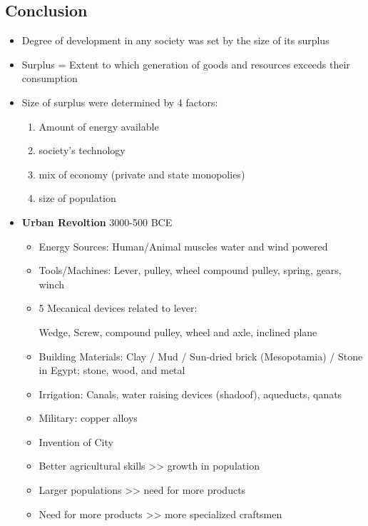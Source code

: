 \documentclass{article}
\begin{document}
\subsection{Conclusion}
\begin{itemize}
  \item Degree of development in any society was set by the size of its surplus
  \item Surplus = Extent to which generation of goods and resources exceeds their consumption
  \item Size of surplus were determined by 4 factors:
    \begin{enumerate}
      \item Amount of energy available
      \item society's technology
      \item mix of economy (private and state monopolies)
      \item size of population
    \end{enumerate}
  \item \textbf{Urban Revoltion} 3000-500 BCE
    \begin{itemize}
      \item Energy Sources: Human/Animal muscles \rightarrow{} water and wind powered
      \item Tools/Machines: Lever, pulley, wheel \rightarrow{}
        compound pulley, spring, gears, winch
      \item 5 Mecanical devices related to lever:

        Wedge, Screw, compound pulley, wheel and axle, inclined plane
      \item Building Materials: Clay / Mud / Sun-dried brick (Mesopotamia) / Stone in Egypt;
        stone, wood, and metal
      \item Irrigation:
        Canals, water raising devices (shadoof), aqueducts, qanats
      \item Military: copper alloys
      \item Invention of City
      \item Better agricultural skills >> growth in population
      \item Larger populations >> need for more products
      \item Need for more products >> more specialized craftsmen
    \end{itemize}
\end{itemize}
\end{document}
